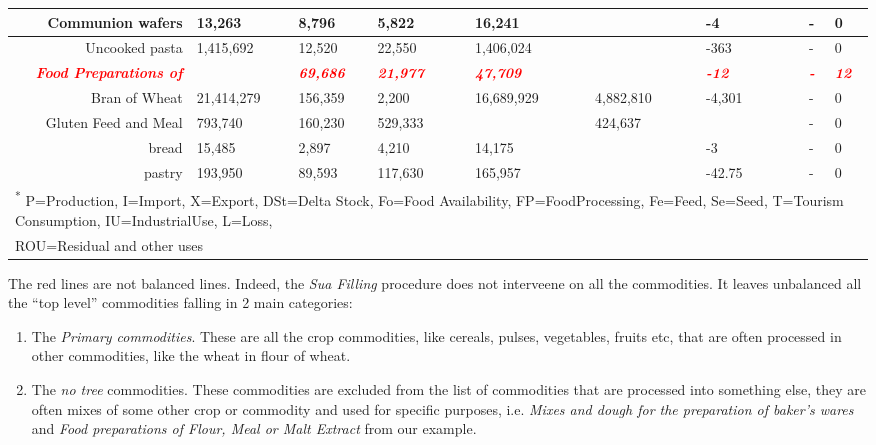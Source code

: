 \documentclass[]{article}
\providecommand{\tightlist}{%
  \setlength{\itemsep}{0pt}\setlength{\parskip}{0pt}}
\begin{document}
\begin{landscape}
\begin{table}
{\begin{tabular}[t]{r|l|l|l|l|l|l|l|l|l|l|l|l|l}
\hline
Communion wafers & 13,263 & 8,796 & 5,822 &  & 16,241 &  &  &  & -4 &  &  & - & 0\\
\hline
Uncooked pasta & 1,415,692 & 12,520 & 22,550 &  & 1,406,024 &  &  &  & -363 &  &  & - & 0\\
\hline
\textcolor{red}{\em{\textbf{Food Preparations of}}} & \textcolor{red}{\em{\textbf{}}} & \textcolor{red}{\em{\textbf{69,686}}} & \textcolor{red}{\em{\textbf{21,977}}} & \textcolor{red}{\em{\textbf{}}} & \textcolor{red}{\em{\textbf{47,709}}} & \textcolor{red}{\em{\textbf{}}} & \textcolor{red}{\em{\textbf{}}} & \textcolor{red}{\em{\textbf{}}} & \textcolor{red}{\em{\textbf{-12}}} & \textcolor{red}{\em{\textbf{}}} & \textcolor{red}{\em{\textbf{}}} & \textcolor{red}{\em{\textbf{-}}} & \textcolor{red}{\em{\textbf{12}}}\\
\hline
Bran of Wheat & 21,414,279 & 156,359 & 2,200 &  & 16,689,929 &  & 4,882,810 &  & -4,301 &  &  & - & 0\\
\hline
Gluten Feed and Meal & 793,740 & 160,230 & 529,333 &  &  &  & 424,637 &  &  &  &  & - & 0\\
\hline
bread & 15,485 & 2,897 & 4,210 &  & 14,175 &  &  &  & -3 &  &  & - & 0\\
\hline
pastry & 193,950 & 89,593 & 117,630 &  & 165,957 &  &  &  & -42.75 &  &  & - & 0\\
\hline
\multicolumn{14}{l}{\textsuperscript{*} P=Production, I=Import, X=Export, DSt=Delta Stock, Fo=Food Availability, FP=FoodProcessing, Fe=Feed, Se=Seed, T=Tourism Consumption, IU=IndustrialUse, L=Loss,}\\
\multicolumn{14}{l}{ROU=Residual and other uses}\\
\end{tabular}}
\end{table}
\end{landscape}

The red lines are not balanced lines. Indeed, the \emph{Sua Filling}
procedure does not interveene on all the commodities. It leaves
unbalanced all the ``top level'' commodities falling in 2 main
categories:

\begin{enumerate}
\def\labelenumi{\arabic{enumi}.}
\tightlist
\item
  The \emph{Primary commodities}. These are all the crop commodities,
  like cereals, pulses, vegetables, fruits etc, that are often processed
  in other commodities, like the wheat in flour of wheat.
\item
  The \emph{no tree} commodities. These commodities are excluded from
  the list of commodities that are processed into something else, they
  are often mixes of some other crop or commodity and used for specific
  purposes, i.e. \emph{Mixes and dough for the preparation of baker's
  wares} and \emph{Food preparations of Flour, Meal or Malt Extract}
  from our example.
\end{enumerate}
\end{document}
